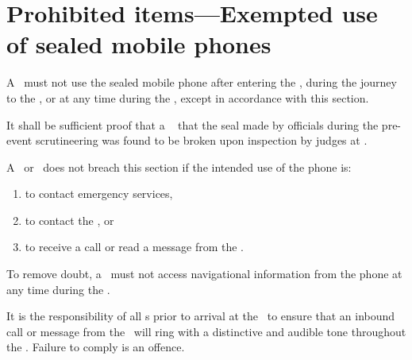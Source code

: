 \documentclass[12pt]{report}
\begin{document}
  \section{Prohibited items---Exempted use of sealed mobile phones}\amended
  \begin{fenumerate}
    \item A \team\ must not use the sealed mobile phone after entering the \scrutineeringarea, during the journey to the \dropoffpoint, or at any time during the \race, except in accordance with this section.

    \item It shall be sufficient proof that a \team\  that the seal made by officials during the pre-event scrutineering was found to be broken upon inspection by judges at \Endpoint.
    \item A \competitor\ or \team\ does not breach this section if the intended use of the phone is:
    \begin{enumerate}
      \item to contact emergency services,
      \item to contact the \RaceDirector, or
      \item to receive a call or read a message from the \RaceDirector.
    \end{enumerate}
    \item To remove doubt, a \team\ must not access navigational information from the phone at any time during the \race.
    \item It is the responsibility of all \team s prior to arrival at the \scrutineeringarea\ to ensure that an inbound call or message from the \RaceDirector\ will ring with a distinctive and audible tone throughout the \race. Failure to comply is an offence.

  \end{fenumerate}
\end{document}

